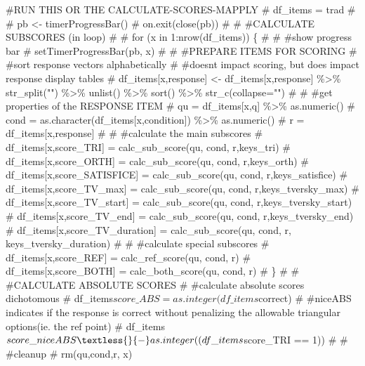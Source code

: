 \documentclass[
  letterpaper,
  DIV=11,
  numbers=noendperiod]{scrreprt}
\newenvironment{Shaded}{\begin{snugshade}}{\end{snugshade}}
\newcommand{\CommentTok}[1]{\textcolor[rgb]{0.37,0.37,0.37}{#1}}
\begin{document}
\begin{Shaded}
\begin{Highlighting}[]
\CommentTok{\#RUN THIS OR THE CALCULATE{-}SCORES{-}MAPPLY}
\CommentTok{\# df\_items = trad }
\CommentTok{\# }
\CommentTok{\# pb \textless{}{-} timerProgressBar() }
\CommentTok{\# on.exit(close(pb)) }
\CommentTok{\#  }
\CommentTok{\# \#CALCULATE SUBSCORES (in loop)}
\CommentTok{\# }
\CommentTok{\# for (x in 1:nrow(df\_items)) \{}
\CommentTok{\#   }
\CommentTok{\#   \#show progress bar }
\CommentTok{\#   setTimerProgressBar(pb, x) }
\CommentTok{\#   }
\CommentTok{\#   \#PREPARE ITEMS FOR SCORING}
\CommentTok{\#   \#sort response vectors alphabetically}
\CommentTok{\#   \#doesn\textquotesingle{}t impact scoring, but does impact response display tables}
\CommentTok{\#    df\_items[x,\textquotesingle{}response\textquotesingle{}] \textless{}{-}  df\_items[x,\textquotesingle{}response\textquotesingle{}] \%\textgreater{}\% str\_split("") \%\textgreater{}\% unlist() \%\textgreater{}\% sort() \%\textgreater{}\% str\_c(collapse="")}
\CommentTok{\# }
\CommentTok{\#   \#get properties of the RESPONSE ITEM}
\CommentTok{\#   qu = df\_items[x,\textquotesingle{}q\textquotesingle{}] \%\textgreater{}\% as.numeric()}
\CommentTok{\#   cond = as.character(df\_items[x,\textquotesingle{}condition\textquotesingle{}]) \%\textgreater{}\% as.numeric()}
\CommentTok{\#   r = df\_items[x,\textquotesingle{}response\textquotesingle{}] }
\CommentTok{\# }
\CommentTok{\#   \#calculate the main subscores}
\CommentTok{\#   df\_items[x,\textquotesingle{}score\_TRI\textquotesingle{}] = calc\_sub\_score(qu, cond, r,keys\_tri)}
\CommentTok{\#   df\_items[x,\textquotesingle{}score\_ORTH\textquotesingle{}] = calc\_sub\_score(qu, cond, r,keys\_orth)}
\CommentTok{\#   df\_items[x,\textquotesingle{}score\_SATISFICE\textquotesingle{}] = calc\_sub\_score(qu, cond, r,keys\_satisfice)}
\CommentTok{\#   df\_items[x,\textquotesingle{}score\_TV\_max\textquotesingle{}] = calc\_sub\_score(qu, cond, r,keys\_tversky\_max)}
\CommentTok{\#   df\_items[x,\textquotesingle{}score\_TV\_start\textquotesingle{}] = calc\_sub\_score(qu, cond, r,keys\_tversky\_start)}
\CommentTok{\#   df\_items[x,\textquotesingle{}score\_TV\_end\textquotesingle{}] = calc\_sub\_score(qu, cond, r,keys\_tversky\_end)}
\CommentTok{\#   df\_items[x,\textquotesingle{}score\_TV\_duration\textquotesingle{}] = calc\_sub\_score(qu, cond, r, keys\_tversky\_duration)}
\CommentTok{\#   }
\CommentTok{\#   \#calculate special subscores}
\CommentTok{\#   df\_items[x,\textquotesingle{}score\_REF\textquotesingle{}] = calc\_ref\_score(qu, cond, r)}
\CommentTok{\#   df\_items[x,\textquotesingle{}score\_BOTH\textquotesingle{}] = calc\_both\_score(qu, cond, r)}
\CommentTok{\# \}}
\CommentTok{\# }
\CommentTok{\# \#CALCULATE ABSOLUTE SCORES}
\CommentTok{\# \#calculate absolute scores dichotomous}
\CommentTok{\# df\_items$score\_ABS = as.integer(df\_items$correct)}
\CommentTok{\# \#niceABS indicates if the response is correct without penalizing the allowable triangular options(ie. the ref point)}
\CommentTok{\# df\_items$score\_niceABS  \textless{}{-} as.integer((df\_items$score\_TRI == 1))}
\CommentTok{\#  }
\CommentTok{\# \#cleanup}
\CommentTok{\# rm(qu,cond,r, x)}


\end{Highlighting}
\end{Shaded}
\end{document}
